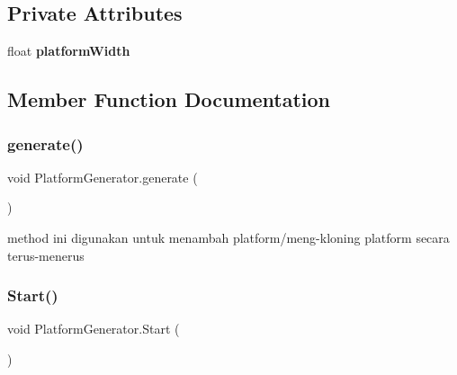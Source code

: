 \subsection*{Private Attributes}
\begin{DoxyCompactItemize}
\item 
\hypertarget{class_platform_generator_abad4d150ee047d135102b79663d718ec}{}\label{class_platform_generator_abad4d150ee047d135102b79663d718ec} 
float {\bfseries platform\+Width}
\end{DoxyCompactItemize}


\subsection{Member Function Documentation}
\hypertarget{class_platform_generator_aa6c531bd8acd0de80999c4033e4f0a8e}{}\label{class_platform_generator_aa6c531bd8acd0de80999c4033e4f0a8e} 
\subsubsection{\texorpdfstring{generate()}{generate()}}
{\footnotesize\ttfamily void Platform\+Generator.\+generate (\begin{DoxyParamCaption}{ }\end{DoxyParamCaption})\hspace{0.3cm}{\ttfamily [private]}}



method ini digunakan untuk menambah platform/meng-\/kloning platform secara terus-\/menerus 

\hypertarget{class_platform_generator_a4a9f8f525415c599d761c8371734619d}{}\label{class_platform_generator_a4a9f8f525415c599d761c8371734619d} 
\subsubsection{\texorpdfstring{Start()}{Start()}}
{\footnotesize\ttfamily void Platform\+Generator.\+Start (\begin{DoxyParamCaption}{ }\end{DoxyParamCaption})\hspace{0.3cm}{\ttfamily [private]}}



